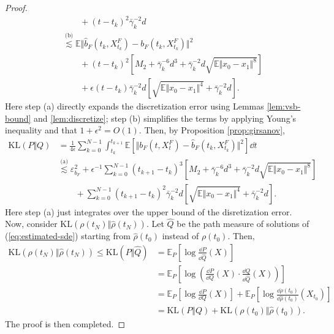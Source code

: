 \begin{proof}
$$\begin{aligned}
        &\qquad+(t-t_k)^2\bar{\gamma}_k^{-2}d\\
        &\overset{\text{(b)}}{\lesssim}\mathbb{E}\Vert\hat{b}_F(t_k,X_{t_k}^F)-b_F(t_k,X_{t_k}^F)\Vert^2\\
        &\qquad+(t-t_k)^2\left[M_2+\bar{\gamma}_k^{-6}d^3+\bar{\gamma}_k^{-2}d\sqrt{\mathbb{E}\Vert x_0-x_1\Vert^{8}}\right]\\
        &\qquad+\epsilon(t-t_k)\bar{\gamma}_k^{-2}d\left[\sqrt{\mathbb{E}\Vert x_0-x_1\Vert^4}+\bar{\gamma}_k^{-2}d\right].
    \end{aligned}$$
    Here step (a) directly expands the discretization error using Lemmas \ref{lem:vsb-bound} and \ref{lem:discretize}; step (b) simplifies the terms by applying Young's inequality and that $1+\epsilon^2=O(1)$. Then, by Proposition \ref{prop:girsanov},
    $$\begin{aligned}
        \text{KL}(P\Vert Q)&=\frac{1}{4\epsilon}\sum_{k=0}^{N-1}\int_{t_k}^{t_{k+1}}\mathbb{E}[\Vert b_F(t,X_t^F)-\hat{b}_F(t_k,X_{t_k}^F)\Vert^2]\dd t\\
        &\overset{\text{(a)}}{\lesssim}\varepsilon_{b_F}^2+\epsilon^{-1}\sum_{k=0}^{N-1}(t_{k+1}-t_k)^3\left[M_2+\bar{\gamma}_k^{-6}d^3+\bar{\gamma}_k^{-2}d\sqrt{\mathbb{E}\Vert x_0-x_1\Vert^{8}}\right]\\
        &\qquad+\sum_{k=0}^{N-1}(t_{k+1}-t_k)^2\bar{\gamma}_k^{-2}d\left[\sqrt{\mathbb{E}\Vert x_0-x_1\Vert^4}+\bar{\gamma}_k^{-2}d\right].
    \end{aligned}$$
    Here step (a) just integrates over the upper bound of the disretization error. Now, consider $\text{KL}(\rho(t_N)\Vert\hat{\rho}(t_N))$. Let $\hat{Q}$ be the path measure of solutions of (\ref{eq:estimated-sde}) starting from $\hat{\rho}(t_0)$ instead of $\rho(t_0)$. Then,
    $$\begin{aligned}
        \text{KL}(\rho(t_N)\Vert\hat{\rho}(t_N))\le\text{KL}(P\Vert\hat{Q})&=\mathbb{E}_P\left[\log\frac{\dd P}{\dd\hat{Q}}(X)\right]\\
        &=\mathbb{E}_P\left[\log\left(\frac{\dd P}{\dd Q}(X)\cdot\frac{\dd Q}{\dd\hat{Q}}(X)\right)\right]\\
        &=\mathbb{E}_P\left[\log\frac{\dd P}{\dd Q}(X)\right]+\mathbb{E}_P\left[\log\frac{\dd\rho(t_0)}{\dd\hat{\rho}(t_0)}(X_{t_0})\right]\\
        &=\text{KL}(P\Vert Q)+\text{KL}(\rho(t_0)\Vert\hat{\rho}(t_0)).
    \end{aligned}$$
    The proof is then completed.
\end{proof}

